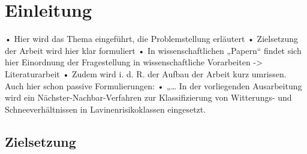 
\section{Einleitung}

 • Hier wird das Thema eingeführt, die Problemstellung erläutert 
• Zielsetzung der Arbeit wird hier klar formuliert
• In wissenschaftlichen „Papern“  findet sich hier Einordnung der 
Fragestellung in wissenschaftliche Vorarbeiten -> Literaturarbeit 
• Zudem wird i. d. R. der Aufbau der Arbeit kurz umrissen.
Auch hier schon passive Formulierungen:
• „…
In der vorliegenden Ausarbeitung wird ein Nächster-Nachbar-Verfahren 
zur Klassifizierung von Witterungs- und Schneeverhältnissen in 
Lavinenrisikoklassen eingesetzt.

\subsection{Zielsetzung}

